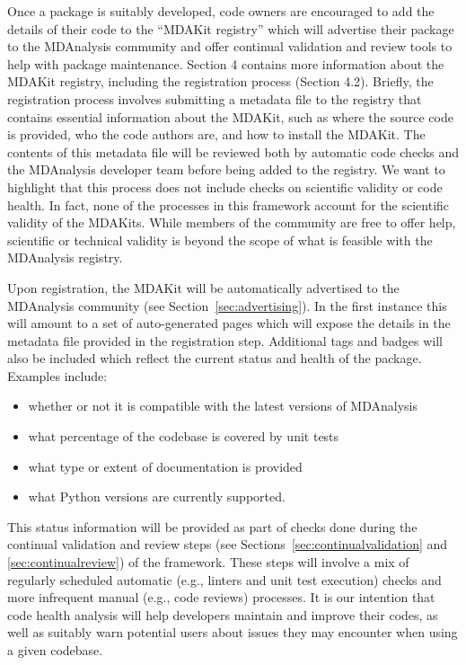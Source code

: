 \documentclass[9pt,whitepaper]{livecoms}
\begin{document}
Once a package is suitably developed, code owners are encouraged to add the details of their code to the “MDAKit registry” which will advertise their package to the MDAnalysis community and offer continual validation and review tools to help with package maintenance. Section 4 contains more information about the MDAKit registry, including the registration process (Section 4.2). Briefly, the registration process involves submitting a metadata file to the registry that contains essential information about the MDAKit, such as where the source code is provided, who the code authors are, and how to install the MDAKit. The contents of this metadata file will be reviewed both by automatic code checks and the MDAnalysis developer team before being  added to the registry. We want to highlight  that this process does not include checks on scientific validity or code health. In fact, none of the processes in this framework account for the scientific validity of the MDAKits. While members of the community are free to offer help, scientific or technical validity is beyond the scope of what is feasible with the MDAnalysis registry.

Upon registration, the MDAKit will be automatically advertised to the MDAnalysis community (see Section~\ref{sec:advertising}). In the first instance this will amount to a set of auto-generated pages which will expose the details in the metadata file provided in the registration step. Additional tags and badges will also be included which reflect the current status and health of the package. Examples include:
\begin{itemize}
    \item whether or not it is compatible with the latest versions of MDAnalysis
    \item what percentage of the codebase is covered by unit tests
    \item what type or extent of documentation is provided
    \item what Python versions are currently supported.
\end{itemize}

This status information will be provided as part of checks done during the continual validation and review steps (see Sections~\ref{sec:continualvalidation} and \ref{sec:continualreview}) of the framework. These steps will involve a mix of regularly scheduled automatic (e.g., linters and unit test execution) checks and more infrequent manual (e.g., code reviews) processes. It is our intention that code health analysis will help developers maintain and improve their codes, as well as suitably warn potential users about issues they may encounter when using a given codebase.
\end{document}
